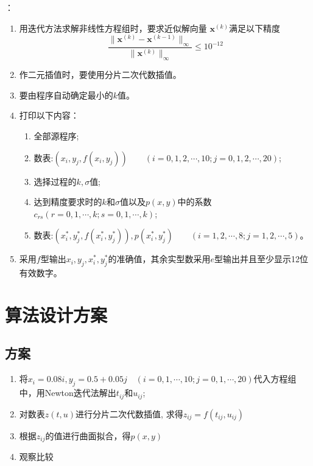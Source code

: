 ：
\begin{enumerate}
\item 用迭代方法求解非线性方程组时，要求近似解向量
${\bm{x}^{(k)}}$满足以下精度
\[\dfrac{\|{\bm{x}^{(k)}} - {\bm{x}^{(k - 1)}}\|_{\infty }}{\|{\bm{x}^{(k)}}\|_{\infty }} \le {10^{ - 12}}\]

\item 作二元插值时，要使用分片二次代数插值。

\item 要由程序自动确定最小的$k$值。

\item 打印以下内容：

\begin{enumerate}
\item 全部源程序;

\item 数表:$({x_i},{y_j},f({x_i},{y_j}))\qquad (i = 0,1,2,\cdots,10;j = 0,1,2,\cdots,20)$;

\item 选择过程的$k,\sigma$值;

\item 达到精度要求时的$k$和$\sigma$值以及$p(x,y)$中的系数
$c_{rs}(r = 0,1,\cdots,k;s = 0,1,\cdots,k)$;

\item 数表:$(x_i^{\ast},y_j^{\ast},f(x_i^{\ast},y_j^{\ast})),p(x_i^{\ast},y_j^{\ast})\qquad (i = 1, 2,\cdots,8;j = 1,2,\cdots,5)$。

\end{enumerate}
\item 采用$f$型输出$x_i,y_j,x_i^{\ast},y_j^{\ast}$的准确值，其余实型数采用$e$型输出并且至少显示12位有效数字。
\end{enumerate}


\newpage
\chapter{算法设计方案}
\section{方案}
\begin{enumerate}
\item 将${x_i} = 0.08i,{y_j} = 0.5 + 0.05j\quad (i=0,1,\cdots,10;j=0,1,\cdots,20)$代入方程组中，用Newton迭代法解出$t_{ij}$和$u_{ij}$;

\item 对数表$z(t,u)$进行分片二次代数插值,
求得$z_{ij}=f(t_{ij},u_{ij})$

\item 根据$z_{ij}$的值进行曲面拟合，得$p(x,y)$

\item 观察比较
\end{enumerate}
\newpage

